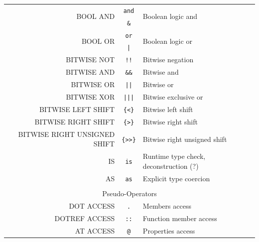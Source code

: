 \documentclass[11pt]{report}
\theoremstyle{definition}
\begin{document}
{\begin{tabular}{rcl}
		\multirow{2}{*}{BOOL AND}       & \texttt{and}    & \multirow{2}{*}{Boolean logic and}              \\
	                                	& \texttt{\&}     &                                                 \\\hline
		\multirow{2}{*}{BOOL OR}        & \texttt{or}     & \multirow{2}{*}{Boolean logic or}               \\
	                                	& \texttt{|}      &                                                 \\\hline
		BITWISE NOT                     & \texttt{!!}     & Bitwise negation                                \\\hline
		BITWISE AND                     & \texttt{\&\&}   & Bitwise and                                     \\\hline
		BITWISE OR                      & \texttt{||}     & Bitwise or                                      \\\hline
		BITWISE XOR                     & \texttt{|||}    & Bitwise exclusive or                            \\\hline
		BITWISE LEFT SHIFT              & \texttt{\{<\}}  & Bitwise left shift                              \\\hline
		BITWISE RIGHT SHIFT             & \texttt{\{>\}}  & Bitwise right shift                             \\\hline
		BITWISE RIGHT UNSIGNED SHIFT    & \texttt{\{>>\}} & Bitwise right unsigned shift                    \\\hline
		IS                              & \texttt{is}     & Runtime type check, deconstruction (?)          \\\hline
		AS                              & \texttt{as}     & Explicit type coercion                          \\\hline
	    \\
		\multicolumn{3}{c}{Pseudo-Operators}                                                                \\\hline
		DOT ACCESS                      & \texttt{.}      & Members access                                  \\\hline
		DOTREF ACCESS                   & \texttt{::}     & Function member access                          \\\hline
		AT ACCESS                       & \texttt{@}      & Properties access                               \\\hline
	\end{tabular}
}
\end{document}
